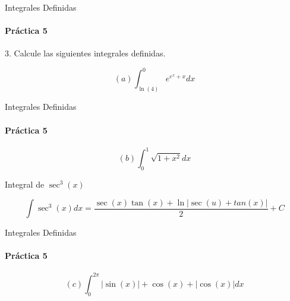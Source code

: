 \documentclass{plantillaPPT}
\begin{document}
\begin{frame}{Integrales Definidas}
    \framesubtitle{Práctica 5}

3. Calcule las siguientes integrales definidas.

\[(a) \int_{\ln(4)}^{0} e^{e^x+x}dx\]

\end{frame}

\begin{frame}{Integrales Definidas}
    \framesubtitle{Práctica 5}

\[(b) \int_{0}^{1} \sqrt{1+x^2}dx\]

\end{frame}

\begin{frame}{Integral de \(\sec^3(x)\)}

\[\int \sec^3(x)dx = \frac{\sec(x)\tan(x) + \ln|\sec(u)+tan(x)|}{2}+C\]
    
\end{frame}

\begin{frame}{Integrales Definidas}
    \framesubtitle{Práctica 5}

\[(c) \int_{0}^{2\pi} |\sin(x)| + \cos(x) + |\cos(x)| dx\]

\end{frame}
\end{document}
